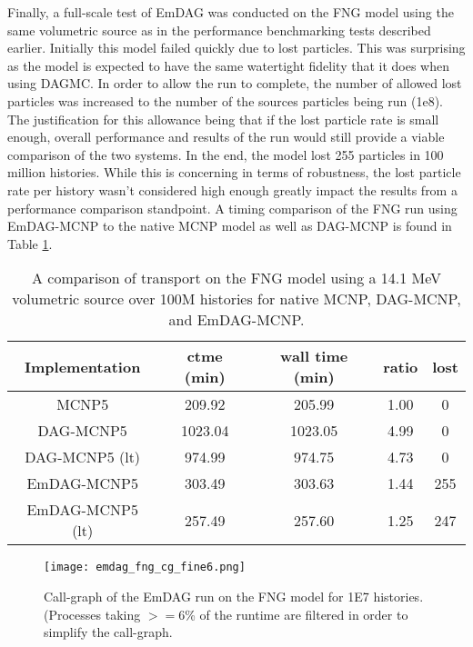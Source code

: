 Finally, a full-scale test of EmDAG was conducted on the FNG model using the
same volumetric source as in the performance benchmarking tests described
earlier. Initially this model failed quickly due to lost particles. This was
surprising as the model is expected to have the same watertight fidelity that it
does when using DAGMC. In order to allow the run to complete, the number of
allowed lost particles was increased to the number of the sources particles
being run (1e8). The justification for this allowance being that if the lost
particle rate is small enough, overall performance and results of the run would
still provide a viable comparison of the two systems. In the end, the model lost
255 particles in 100 million histories. While this is concerning in terms of
robustness, the lost particle rate per history wasn't considered high enough
greatly impact the results from a performance comparison standpoint. A timing
comparison of the FNG run using EmDAG-MCNP to the native MCNP model as well as
DAG-MCNP is found in Table \ref{fngemdag}.

\begin{table}[H]
  \small
  \begin{center}
        \begin{tabular}{|c|c|c|c|c|}
      \hline
      \textbf{Implementation} & \textbf{ctme (min)} & \textbf{wall time (min)} & \textbf{ratio} & \textbf{lost} \\
      \hline
      MCNP5 & 209.92 & 205.99 &  1.00 & 0 \\
      \hline
      DAG-MCNP5 & 1023.04 & 1023.05 & 4.99 & 0  \\
      \hline
      DAG-MCNP5 (lt) & 974.99 & 974.75 & 4.73 & 0  \\
      \hline      
      EmDAG-MCNP5 & 303.49 & 303.63 & 1.44 & 255  \\
      \hline
      EmDAG-MCNP5 (lt) & 257.49 & 257.60  & 1.25 & 247 \\
      \hline
    \end{tabular} 
    \caption{A comparison of transport on the FNG model using a 14.1 MeV
      volumetric source over 100M histories for native MCNP, DAG-MCNP, and
      EmDAG-MCNP.}
    \label{fngemdag}
  \end{center}
\end{table}


\begin{figure}
  \centering
  \texttt{[image: emdag\_fng\_cg\_fine6.png]}
  \caption{Call-graph of the EmDAG run on the FNG model for 1E7
    histories. (Processes taking $>=$6\% of the runtime are filtered in order to
    simplify the call-graph.}
  \label{emdag-fng-coarse}  
\end{figure}

